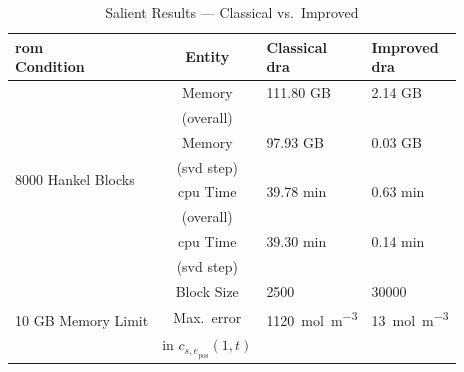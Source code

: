 \begin{table}[!htbp]
	\centering
	\caption{Salient Results --- Classical vs.\ Improved  }
	\label{tbl:salientresults}
	\setlength{\extrarowheight}{1pt}
	\begin{tabular}{ @{} l c l l @{} }
		\toprule
		\makecell{\gls{rom} \\ Condition} & {Entity} & \makecell{Classical \\ \gls{dra} } & \makecell{Improved \\ \gls{dra}} \\
		\midrule
		\multirow{8}{1.22cm}{8000 Hankel Blocks} & Memory                         & 111.80 GB                        & 2.14 GB                        \\ [-5pt]
                                                 & \footnotesize (overall)        &                                  &                                \\
                                                 & Memory                         & 97.93 GB                         & 0.03 GB                        \\ [-5pt]
                                                 & \footnotesize(\gls{svd} step)  &                                  &                                \\
                                                 & \gls{cpu} Time                 & 39.78 min                        & 0.63 min                       \\ [-5pt]
                                                 & \footnotesize(overall)         &                                  &                                \\
                                                 & \gls{cpu} Time                 & 39.30 min                        & 0.14 min                       \\ [-5pt]
                                                 & \footnotesize(\gls{svd} step)  &                                  &                                \\ [2.5pt]
		\midrule
		\multirow{3}{1.22cm}{10 GB Memory Limit} & Block Size                     & 2500                             & 30000                          \\ [5pt]
                                                 & Max.\ error                    & \SI{1120}{\mole\per\meter\cubed} & \SI{13}{\mole\per\meter\cubed} \\ [-5pt]
                                                 & in $c_{{s,e}_\text{pos}}(1,t)$ &                                  &                                \\ [5pt]
		\bottomrule
	\end{tabular}
\end{table}

